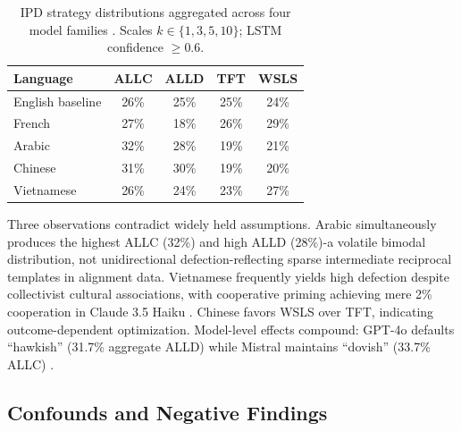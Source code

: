 \documentclass[11pt]{article}
\begin{document}
\begin{table}[t]
\centering
\small
\begin{tabular}{@{}lcccc@{}}
\toprule
\textbf{Language} & \textbf{ALLC} & \textbf{ALLD} & \textbf{TFT} & \textbf{WSLS} \\
\midrule
English baseline & 26\% & 25\% & 25\% & 24\% \\
French & 27\% & 18\% & 26\% & 29\% \\
Arabic & 32\% & 28\% & 19\% & 21\% \\
Chinese & 31\% & 30\% & 19\% & 20\% \\
Vietnamese & 26\% & 24\% & 23\% & 27\% \\
\bottomrule
\end{tabular}
\caption{IPD strategy distributions aggregated across four model families \citep{huynh2026moreatstake, za2026towards}. Scales $k \in \{1,3,5,10\}$; LSTM confidence $\geq 0.6$.}
\label{tab:strategy_divergence}
\end{table}

Three observations contradict widely held assumptions. Arabic simultaneously produces the highest ALLC (32\%) and high ALLD (28\%)-a volatile bimodal distribution, not unidirectional defection-reflecting sparse intermediate reciprocal templates in alignment data. Vietnamese frequently yields high defection despite collectivist cultural associations, with cooperative priming achieving mere 2\% cooperation in Claude 3.5 Haiku \citep{huynh2025fairgame}. Chinese favors WSLS over TFT, indicating outcome-dependent optimization. Model-level effects compound: GPT-4o defaults ``hawkish'' (31.7\% aggregate ALLD) while Mistral maintains ``dovish'' (33.7\% ALLC) \citep{huynh2026moreatstake}.

\subsection{Confounds and Negative Findings}
\label{sec:confounds}
\end{document}
